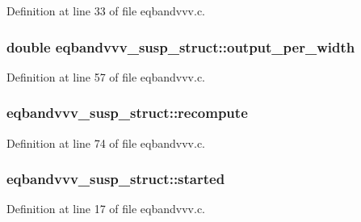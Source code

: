 Definition at line 33 of file eqbandvvv.\+c.

\subsubsection[{\texorpdfstring{output\+\_\+per\+\_\+width}{output_per_width}}]{\setlength{\rightskip}{0pt plus 5cm}double eqbandvvv\+\_\+susp\+\_\+struct\+::output\+\_\+per\+\_\+width}\hypertarget{structeqbandvvv__susp__struct_aee0d41358a4548f7bcee511d2d63e542}{}\label{structeqbandvvv__susp__struct_aee0d41358a4548f7bcee511d2d63e542}


Definition at line 57 of file eqbandvvv.\+c.

\subsubsection[{\texorpdfstring{recompute}{recompute}}]{ eqbandvvv\+\_\+susp\+\_\+struct\+::recompute}\hypertarget{structeqbandvvv__susp__struct_af2b45526043d9d589e5627099406a368}{}\label{structeqbandvvv__susp__struct_af2b45526043d9d589e5627099406a368}


Definition at line 74 of file eqbandvvv.\+c.

\subsubsection[{\texorpdfstring{started}{started}}]{ eqbandvvv\+\_\+susp\+\_\+struct\+::started}\hypertarget{structeqbandvvv__susp__struct_a357c08cc1febc2e285c2febc9d9565b1}{}\label{structeqbandvvv__susp__struct_a357c08cc1febc2e285c2febc9d9565b1}


Definition at line 17 of file eqbandvvv.\+c.

